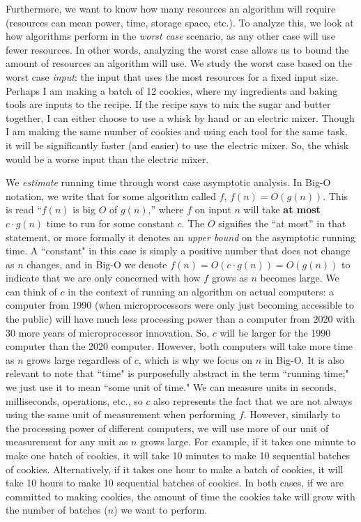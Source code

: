 Furthermore, we want to know how many resources an algorithm will require
(resources can mean power, time, storage space, etc.). To analyze this, we look
at how algorithms perform in the \textit{worst case} scenario, as any other case will
use fewer resources. In other words, analyzing the worst case allows us to bound the
amount of resources an algorithm will use. We study the worst case based on the
worst case \textit{input}: the input that uses the most resources for a fixed
input size. Perhaps I am making a batch of 12 cookies, where my ingredients and baking tools are 
inputs to the recipe. If the recipe says to mix the sugar and butter
together, I can either choose to use a whisk by hand or an electric mixer.
Though I am making the same number of cookies and using each tool for the same
task, it will be significantly faster (and easier) to use the electric mixer.
So, the whisk would be a worse input than the electric mixer. 

We \textit{estimate} running time through worst case asymptotic analysis. In Big-O
notation, we write that for some algorithm called $f$, $f(n) = O(g(n))$. This is
read “$f(n)$ is big $O$ of $g(n)$,” where $f$ on input $n$ will take \textbf{at
most} $c \cdot g(n)$ time to run for some constant $c$. The $O$ signifies
the “at most” in that statement, or more formally it denotes an \textit{upper
bound} on the asymptotic running time. A ``constant" in this case is simply a
positive number that does not change as $n$ changes, and in Big-O we denote
$f(n) = O(c \cdot g(n)) = O(g(n))$ to indicate that we are only concerned with how
$f$ grows as $n$ becomes large. We can think of $c$ in the context of
running an algorithm on actual computers: a computer from 1990 (when
microprocessors were only just becoming accessible to the public) will have much
less processing power than a computer from 2020 with 30 more years of microprocessor
innovation. So, $c$ will be larger for the 1990 computer than the 2020 computer.
However, both computers will take more time as $n$ grows large regardless of
$c$, which is why we focus on $n$ in Big-O. It is also relevant to note that
``time" is purposefully abstract in the term ``running time;" we just use it to mean
``some unit of time." We can measure units in seconds, milliseconds, operations,
etc., so $c$ also represents the fact that we are not always using the same unit
of measurement when performing $f$. However, similarly to the processing power
of different computers, we will use more of our unit of measurement for any unit
as $n$ grows large. For example, if it takes one minute to make one batch of
cookies, it will take 10 minutes to make 10 sequential batches of cookies.
Alternatively, if it takes one hour to make a batch of cookies, it will take 10
hours to make 10 sequential batches of cookies. In both cases, if we are
committed to making cookies, the amount of time the cookies take
will grow with the number of batches ($n$) we want to perform. 

